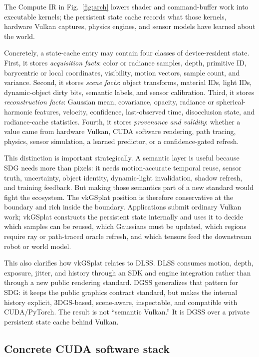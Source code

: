 \documentclass[10pt,journal,onecolumn]{IEEEtran}
\begin{document}
The Compute IR in Fig.~\ref{fig:arch} lowers shader and command-buffer work into
executable kernels; the persistent state cache records what those kernels,
hardware Vulkan captures, physics engines, and sensor models have learned about
the world.

Concretely, a state-cache entry may contain four classes of device-resident
state. First, it stores \emph{acquisition facts}: color or radiance samples,
depth, primitive ID, barycentric or local coordinates, visibility, motion
vectors, sample count, and variance. Second, it stores \emph{scene facts}:
object transforms, material IDs, light IDs, dynamic-object dirty bits, semantic
labels, and sensor calibration. Third, it stores \emph{reconstruction facts}:
Gaussian mean, covariance, opacity, radiance or spherical-harmonic features,
velocity, confidence, last-observed time, disocclusion state, and radiance-cache
statistics. Fourth, it stores \emph{provenance and validity}: whether a value
came from hardware Vulkan, CUDA software rendering, path tracing, physics,
sensor simulation, a learned predictor, or a confidence-gated refresh.

This distinction is important strategically. A semantic layer is useful because
SDG needs more than pixels: it needs motion-accurate temporal reuse, sensor
truth, uncertainty, object identity, dynamic-light invalidation, shadow
refresh, and training feedback. But making those semantics part of a new
standard would fight the ecosystem. The vkGSplat position is therefore
conservative at the boundary and rich inside the boundary. Applications submit
ordinary Vulkan work; vkGSplat constructs the persistent state internally and
uses it to decide which samples can be reused, which Gaussians must be updated,
which regions require ray or path-traced oracle refresh, and which tensors feed
the downstream robot or world model.

This also clarifies how vkGSplat relates to DLSS. DLSS consumes motion, depth,
exposure, jitter, and history through an SDK and engine integration rather than
through a new public rendering standard. DGSS generalizes that pattern for SDG:
it keeps the public graphics contract standard, but makes the internal history
explicit, 3DGS-based, scene-aware, inspectable, and compatible with CUDA/PyTorch.
The result is not ``semantic Vulkan.'' It is DGSS over a private persistent
state cache behind Vulkan.

\subsection{Concrete CUDA software stack}
\end{document}
